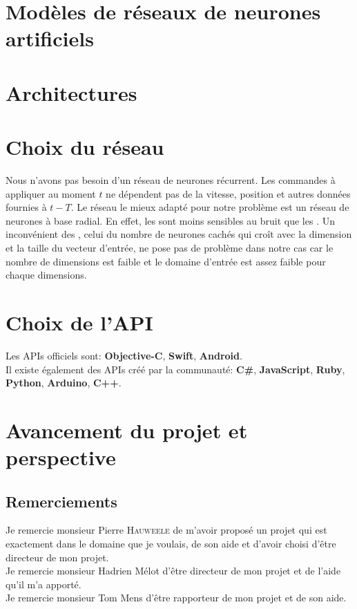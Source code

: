 \documentclass[12pt,a4paper,oneside, titlepage]{article}
\begin{document}


\tableofcontents
\newpage


\section{Modèles de réseaux de neurones artificiels}
\terminologie





\section{Architectures}

\section{Choix du réseau}
Nous n'avons pas besoin d'un réseau de neurones récurrent. Les commandes à appliquer au moment $t$ ne dépendent pas de la vitesse, position et autres données fournies à $t-T$.
Le réseau le mieux adapté pour notre problème est un réseau de neurones à base radial.
En effet, les \rbf sont moins sensibles au bruit que les \mlp \cite{adversarial,Gauthier}.%
Un inconvénient des \rbf, celui du nombre de neurones cachés qui croît avec la dimension et la taille du vecteur d'entrée, ne pose pas de problème dans notre cas
car le nombre de dimensions est faible
et le domaine d'entrée est assez faible pour chaque dimensions.
\section{Choix de l'API}
Les APIs officiels sont:\cite{SDKofficiels} \textbf{Objective-C}, \textbf{Swift}, \textbf{Android}.\\
Il existe également des APIs créé par la communauté:\cite{gosphero} \textbf{C\#}, \textbf{JavaScript}, \textbf{Ruby}, \textbf{Python}\cite{pythonAPI}, \textbf{Arduino}, \textbf{C++}\cite{cppAPI}.\\
\section{Avancement du projet et perspective}
\subsection*{Remerciements}
\noindent Je remercie monsieur Pierre \textsc{Hauweele} de m'avoir proposé un projet qui est exactement dans le domaine que je voulais, de son aide et d'avoir choisi d'être directeur de mon projet.\\

\noindent Je remercie monsieur Hadrien Mélot d'être directeur de mon projet et de l'aide qu'il m'a apporté.\\

\noindent Je remercie monsieur Tom Mens d'être rapporteur de mon projet et de son aide.\\



\end{document}
